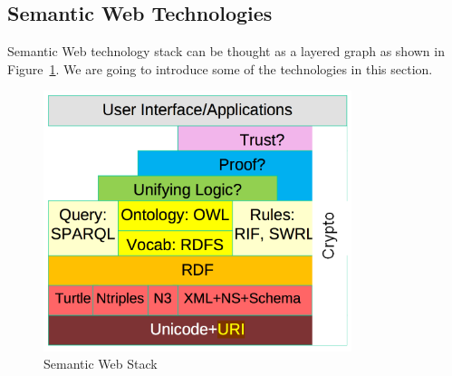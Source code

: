 \subsection{Semantic Web Technologies}

Semantic Web technology stack can be thought as a layered graph as shown in Figure~\ref{fig:SemanticWebStack}. We are going to introduce some of the technologies in this section.

\clearpage

\begin{figure}[ht!]
\centering
\includegraphics[width=90mm]{images/semantic-web-stack.png}
\caption{Semantic Web Stack\protect\footnotemark}
\label{fig:SemanticWebStack}
\end{figure}


